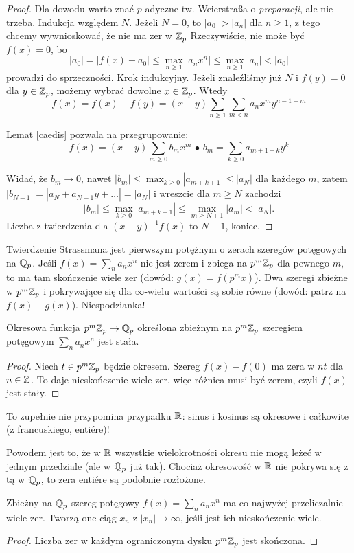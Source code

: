 \begin{proof}
	Dla dowodu warto znać $p$-adyczne tw. Weierstraßa o \emph{preparacji}, ale nie trzeba.
	Indukcja względem $N$.
	Jeżeli $N = 0$, to $|a_0| > |a_n|$ dla $n \ge 1$, z tego chcemy wywnioskować, że nie ma zer w $\mathbb Z_p$
	Rzeczywiście, nie może być $f(x) = 0$, bo
	\[
		|a_0| = |f(x) - a_0| \le \max_{n \ge 1}|a_nx^n| \le \max_{n \ge 1} |a_n| < |a_0|
	\]
	prowadzi do sprzeczności.
	Krok indukcyjny.
	Jeżeli znaleźliśmy już $N$ i $f(y) = 0$ dla $y \in \mathbb Z_p$, możemy wybrać dowolne $x \in \mathbb Z_p$.
	Wtedy
	\[
		f(x) = f(x) - f(y) = (x-y) \sum_{n \ge 1} \sum_{m < n} a_n x^m y^{n-1-m}
	\]

	Lemat \ref{caedis} pozwala na przegrupowanie:
	\[
		f(x) = (x - y) \sum_{m \ge 0} b_m x^m \,\bullet\,
		b_m = \sum_{k \ge 0} a_{m+1+k} y^k
	\]
	
	Widać, że $b_m \to 0$, nawet $|b_m| \le \max_{k \ge 0} |a_{m+k+1}| \le |a_N|$ dla każdego $m$, zatem $|b_{N-1}| = |a_N + a_{N+1} y + \dots| = |a_N|$ i wreszcie dla $m \ge N$ zachodzi
	\[
		|b_m| \le \max_{k \ge 0}|a_{m+k+1}| \le \max_{m \ge N+1} |a_m| < |a_N|.
	\]
	Liczba z twierdzenia dla $(x-y)^{-1}f(x)$ to $N-1$, koniec.
\end{proof}

Twierdzenie Strassmana jest pierwszym potężnym o zerach szeregów potęgowych na $\mathbb Q_p$.
Jeśli $f(x) = \sum_n a_n x^n$ nie jest zerem i zbiega na $p^m \mathbb Z_p$ dla pewnego $m$, to ma tam skończenie wiele zer (dowód: $g(x) = f(p^mx)$).
Dwa szeregi zbieżne w $p^m\mathbb Z_p$ i pokrywające się dla $\infty$-wielu wartości są sobie równe (dowód: patrz na $f(x) - g(x)$). Niespodzianka!

\begin{fakt} \label{arcis}
	Okresowa funkcja $p^m \mathbb Z_p \to \mathbb Q_p$ określona zbieżnym na $p^m \mathbb Z_p$ szeregiem potęgowym $\sum_n a_n x^n$ jest stała.
\end{fakt}

\begin{proof}
	Niech $t \in p^m\mathbb Z_p$ będzie okresem.
	Szereg $f(x)-f(0)$ ma zera w $n t$ dla $n \in \mathbb Z$.
	To daje nieskończenie wiele zer, więc różnica musi być zerem, czyli $f(x)$ jest stały.
\end{proof}

To zupełnie nie przypomina przypadku $\mathbb R$: sinus i kosinus są okresowe i całkowite (z francuskiego, entiére)!

Powodem jest to, że w $\mathbb R$ wszystkie wielokrotności okresu nie mogą leżeć w jednym przedziale (ale w $\mathbb Q_p$ już tak).
Chociaż okresowość w $\mathbb R$ nie pokrywa się z tą w $\mathbb Q_p$, to zera entiére są podobnie rozłożone.

\begin{fakt}
	Zbieżny na $\mathbb Q_p$ szereg potęgowy $f(x) = \sum_n a_n x^n$ ma co najwyżej przeliczalnie wiele zer.
	Tworzą one ciąg $x_n$ z $|x_n| \to \infty$, jeśli jest ich nieskończenie wiele.
\end{fakt}

\begin{proof}
	Liczba zer w każdym ograniczonym dysku $p^m \mathbb Z_p$ jest skończona.
\end{proof}